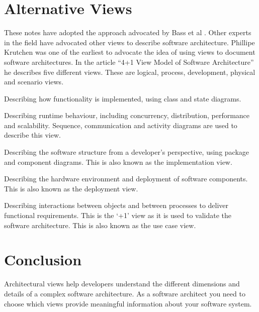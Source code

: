 \section{Alternative Views}
These notes have adopted the approach advocated by Bass et al \cite{bass2021software}.
Other experts in the field have advocated other views to describe software architecture.
Phillipe Krutchen was one of the earliest to advocate the idea of using views to document software architectures.
In the article ``4+1 View Model of Software Architecture'' \cite{4+1-model} he describes five different views.
These are logical, process, development, physical and scenario views.
\begin{description}[nosep,left=5mm]
    \item[Logical] Describing how functionality is implemented, using class and state diagrams.
    \item[Process] Describing runtime behaviour, including concurrency, distribution, performance and scalability.
                            Sequence, communication and activity diagrams are used to describe this view.
    \item[Development] Describing the software structure from a developer's perspective, using package and component diagrams.
                                    This is also known as the implementation view.
    \item[Physical] Describing the hardware environment and deployment of software components.
                            This is also known as the deployment view.
    \item[Scenario] Describing interactions between objects and between processes to deliver functional requirements.
                             This is the `+1' view as it is used to validate the software architecture.
                             This is also known as the use case view.
\end{description}

\section{Conclusion}
Architectural views help developers understand the different dimensions and details of a complex software architecture.
As a software architect you need to choose which views provide meaningful information about your software system.
